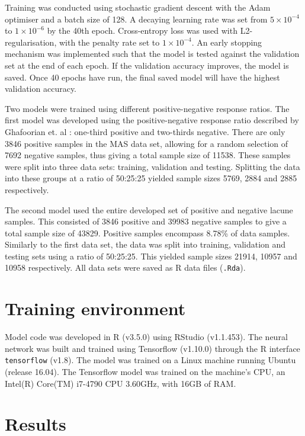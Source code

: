 Training was conducted using stochastic gradient descent with the Adam optimiser and a batch size of 128. A decaying learning rate was set from $5\times10^{-4}$ to $1\times10^{-6}$ by the 40th epoch. Cross-entropy loss was used with L2-regularisation, with the penalty rate set to $1\times10^{-4}$. An early stopping mechanism was implemented such that the model is tested against the validation set at the end of each epoch. If the validation accuracy improves, the model is saved. Once 40 epochs have run, the final saved model will have the highest validation accuracy.

Two models were trained using different positive-negative response ratios. The first model was developed using the positive-negative response ratio described by Ghafoorian et. al \cite{GhafoorianM.2017Dml3}: one-third positive and two-thirds negative. There are only 3846 positive samples in the MAS data set, allowing for a random selection of 7692 negative samples, thus giving a total sample size of 11538. These samples were split into three data sets: training, validation and testing. Splitting the data into these groups at a ratio of 50:25:25 yielded sample sizes 5769, 2884 and 2885 respectively.

The second model used the entire developed set of positive and negative lacune samples. This consisted of 3846 positive and 39983 negative samples to give a total sample size of 43829. Positive samples encompass 8.78\% of data samples. Similarly to the first data set, the data was split into training, validation and testing sets using a ratio of 50:25:25. This yielded sample sizes 21914, 10957 and 10958 respectively. All data sets were saved as R data files (\texttt{.Rda}).


\section{Training environment}

Model code was developed in R (v3.5.0) using RStudio (v1.1.453). The neural network was built and trained using Tensorflow (v1.10.0) through the R interface \texttt{tensorflow} (v1.8). The model was trained on a Linux machine running Ubuntu (release 16.04). The Tensorflow model was trained on the machine's CPU, an Intel(R) Core(TM) i7-4790 CPU 3.60GHz, with 16GB of RAM. 

\section{Results}

